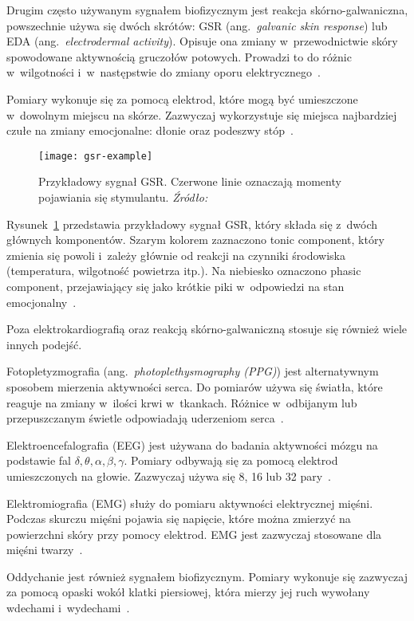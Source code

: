Drugim często używanym sygnałem biofizycznym jest reakcja skórno-galwaniczna, powszechnie używa się dwóch skrótów: GSR (ang.~\textit{galvanic skin response}) lub EDA (ang.~\textit{electrodermal activity}).
Opisuje ona zmiany w~przewodnictwie skóry spowodowane aktywnością gruczołów potowych.
Prowadzi to do różnic w~wilgotności i~w~następstwie do zmiany oporu elektrycznego~\cite{Dzedzickis2020}.

Pomiary wykonuje się za pomocą elektrod, które mogą być umieszczone w~dowolnym miejscu na skórze.
Zazwyczaj wykorzystuje się miejsca najbardziej czułe na zmiany emocjonalne: dłonie oraz podeszwy stóp~\cite{Calvo2015}.

\begin{figure}[h]
    \centering
    \texttt{[image: gsr-example]}
    \caption{Przykładowy sygnał GSR. Czerwone linie oznaczają momenty pojawiania się stymulantu. \textit{Źródło:~\cite{Dzedzickis2020}}}
    \label{fig:gsr-example}
\end{figure}

Rysunek~\ref{fig:gsr-example} przedstawia przykładowy sygnał GSR, który składa się z~dwóch głównych komponentów.
Szarym kolorem zaznaczono tonic component, który zmienia się powoli i~zależy głównie od reakcji na czynniki środowiska (temperatura, wilgotność powietrza itp.).
Na niebiesko oznaczono phasic component, przejawiający się jako krótkie piki w~odpowiedzi na stan emocjonalny~\cite{Dzedzickis2020}.

Poza elektrokardiografią oraz reakcją skórno-galwaniczną stosuje się również wiele innych podejść.

Fotopletyzmografia (ang.~\textit{photoplethysmography (PPG)}) jest alternatywnym sposobem mierzenia aktywności serca.
Do pomiarów używa się światła, które reaguje na zmiany w~ilości krwi w~tkankach.
Różnice w~odbijanym lub przepuszczanym świetle odpowiadają uderzeniom serca~\cite{Dzedzickis2020}.

Elektroencefalografia (EEG) jest używana do badania aktywności mózgu na podstawie fal $\delta, \theta, \alpha, \beta, \gamma$.
Pomiary odbywają się za pomocą elektrod umieszczonych na głowie.
Zazwyczaj używa się 8, 16 lub 32 pary~\cite{Dzedzickis2020}.

Elektromiografia (EMG) służy do pomiaru aktywności elektrycznej mięśni.
Podczas skurczu mięśni pojawia się napięcie, które można zmierzyć na powierzchni skóry przy pomocy elektrod.
EMG jest zazwyczaj stosowane dla mięśni twarzy~\cite{Dzedzickis2020}.

Oddychanie jest również sygnałem biofizycznym.
Pomiary wykonuje się zazwyczaj za pomocą opaski wokół klatki piersiowej, która mierzy jej ruch wywołany wdechami i~wydechami~\cite{Dzedzickis2020}.

